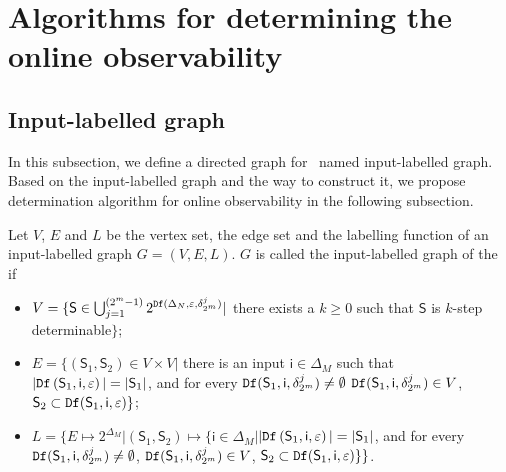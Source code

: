 \section{Algorithms for determining the online observability}
\label{sec:deter}


\subsection{Input-labelled graph}
In this subsection, we define a directed graph for \BCN\ named input-labelled graph. Based on the input-labelled graph and the way to construct it, we propose determination algorithm for online observability in the following subsection.

\begin{definition}
Let $V$, $E$ and $L$ be the vertex set, the edge set and the labelling function of an input-labelled graph $G=(V, E, L)$. $G$ is called the input-labelled graph of the \BCN\, if 
\begin{itemize}
\item  $V=\{\mathsf{S}\in\bigcup_{j=1}^{(2^m -1)} 2^{{\tt Df}(\Delta_N,\varepsilon,\delta^j_{2^m} )}|$ there exists a $k\ge0$ such that $\mathsf{S}$ is $k$-step determinable$\}$;
\item  $E=\{(\mathsf{S}_1,\mathsf{S}_2)\in V\times V|$ there is an input $\mathsf{i} \in \Delta_M$ such that $|{\tt Df}\left(\mathsf{S}_1,\mathsf{i},\varepsilon\right)|=|\mathsf{S}_1|$, and for every ${\tt Df}(\mathsf{S}_1,\mathsf{i},\delta^j_{2^m})\neq \emptyset$ ${\tt Df}(\mathsf{S}_1,\mathsf{i},\delta^j_{2^m})\in V$, $\mathsf{S}_2\subset{\tt Df}(\mathsf{S}_1,\mathsf{i},\varepsilon)\}$;
\item  $L=\{E\mapsto 2^{\Delta_M}|(\mathsf{S}_1,\mathsf{S}_2)\mapsto\{\mathsf{i}\in \Delta_M|$$|{\tt Df}\left(\mathsf{S}_1,\mathsf{i},\varepsilon\right)|=|\mathsf{S}_1|$, and for every ${\tt Df}(\mathsf{S}_1,\mathsf{i},\delta^j_{2^m})\neq \emptyset$, ${\tt Df}(\mathsf{S}_1,\mathsf{i},\delta^j_{2^m})\in V$, $\mathsf{S}_2\subset{\tt Df}(\mathsf{S}_1,\mathsf{i},\varepsilon)\}\}$.
 \end{itemize}

\end{definition}

